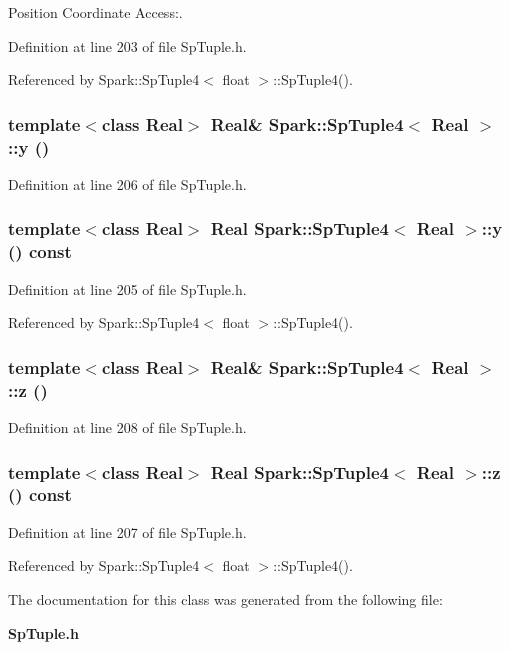 Position Coordinate Access:. 

Definition at line 203 of file Sp\-Tuple.h.

Referenced by Spark::Sp\-Tuple4$<$ float $>$::Sp\-Tuple4().
\subsubsection{\setlength{\rightskip}{0pt plus 5cm}template$<$class Real$>$ Real\& {\bf Spark::Sp\-Tuple4}$<$ Real $>$::y ()\hspace{0.3cm}{\tt  [inline]}}\label{classSpark_1_1SpTuple4_a5}


Definition at line 206 of file Sp\-Tuple.h.
\subsubsection{\setlength{\rightskip}{0pt plus 5cm}template$<$class Real$>$ Real {\bf Spark::Sp\-Tuple4}$<$ Real $>$::y () const\hspace{0.3cm}{\tt  [inline]}}\label{classSpark_1_1SpTuple4_a4}


Definition at line 205 of file Sp\-Tuple.h.

Referenced by Spark::Sp\-Tuple4$<$ float $>$::Sp\-Tuple4().
\subsubsection{\setlength{\rightskip}{0pt plus 5cm}template$<$class Real$>$ Real\& {\bf Spark::Sp\-Tuple4}$<$ Real $>$::z ()\hspace{0.3cm}{\tt  [inline]}}\label{classSpark_1_1SpTuple4_a7}


Definition at line 208 of file Sp\-Tuple.h.
\subsubsection{\setlength{\rightskip}{0pt plus 5cm}template$<$class Real$>$ Real {\bf Spark::Sp\-Tuple4}$<$ Real $>$::z () const\hspace{0.3cm}{\tt  [inline]}}\label{classSpark_1_1SpTuple4_a6}


Definition at line 207 of file Sp\-Tuple.h.

Referenced by Spark::Sp\-Tuple4$<$ float $>$::Sp\-Tuple4().

The documentation for this class was generated from the following file:\begin{CompactItemize}
\item 
{\bf Sp\-Tuple.h}\end{CompactItemize}
